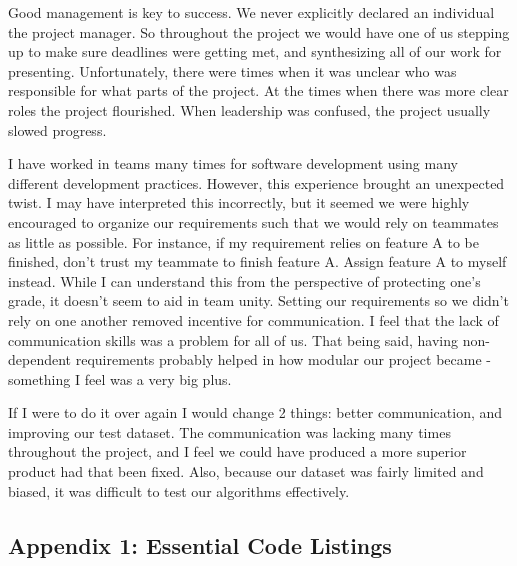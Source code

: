 \documentclass[letterpaper,10pt,titlepage]{article}
\begin{document}
Good management is key to success. We never explicitly declared an individual the project
manager. So throughout the project we would have one of us stepping up to make sure 
deadlines were getting met, and synthesizing all of our work for presenting. 
Unfortunately, there were times when it was unclear who was responsible for what parts of the project. 
At the times when there was more clear roles the project flourished. When leadership was confused, the project usually slowed progress.

I have worked in teams many times for software development using many different development practices. 
However, this experience brought an unexpected twist.
I may have interpreted this incorrectly, but it seemed we were highly encouraged to organize 
our requirements such that we would rely on teammates as little as possible.
For instance, if my requirement relies on feature A to be finished, don't trust my teammate to finish feature A. Assign feature A to myself instead.
While I can understand this from the perspective of protecting one's grade, it doesn't seem to aid in team unity.
Setting our requirements so we didn't rely on one another removed incentive for communication.
I feel that the lack of communication skills was a problem for all of us. 
That being said, having non-dependent requirements probably helped in how modular our project became - something I feel was a very big plus.

If I were to do it over again I would change 2 things: better communication, and improving our test dataset.
The communication was lacking many times throughout the project, and I feel we could have
produced a more superior product had that been fixed. Also, because our dataset was fairly limited and biased, it was difficult to test our algorithms effectively.

\newpage

\vspace*{\fill}
\begin{center}
\begin{minipage}{0.6\textwidth}
\section*{Appendix 1: Essential Code Listings}
\end{minipage}
\end{center}
\vfill

\newpage
\end{document}
